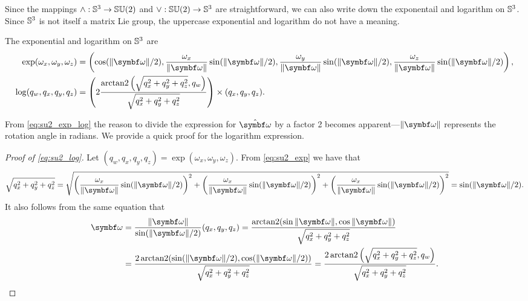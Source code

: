 Since the mappings $\wedge: {\mathbb{S}^3} \rightarrow {\mathbb{SU}(2)}$ and $\vee: {\mathbb{SU}(2)} \rightarrow {\mathbb{S}^3}$ are straightforward, we can also write down the exponentail and logarithm on ${\mathbb{S}^3}$. Since ${\mathbb{S}^3}$ is not itself a matrix Lie group, the uppercase exponential and logarithm do not have a meaning.
\begin{important}
  The exponential and logarithm on ${\mathbb{S}^3}$ are
  \begin{subequations}
    \label{eq:su2_exp_log}
    \begin{align}
      \label{eq:su2_exp}\exp (\omega_x, \omega_y, \omega_z) & = \left(
      \cos (\| \bomega \|/2), \frac{\omega_x}{\| \bomega \|} \sin (\| \bomega \|/2), \frac{\omega_y}{\| \bomega \|} \sin (\| \bomega \|/2), \frac{\omega_z}{\| \bomega \|} \sin ( \| \bomega \|/2 ) \right), \\
      \label{eq:su2_log} \log (q_w, q_x, q_y, q_z)          & = \left( 2 \frac{ \arctantwo \left(\sqrt{q_x^2 + q_y^2 + q_z^2}, q_w \right) }{ \sqrt{q_x^2 + q_y^2 + q_z^2} } \right) \times (q_x, q_y, q_z).
    \end{align}
  \end{subequations}
\end{important}
From \eqref{eq:su2_exp_log} the reason to divide the expression for $\hat \bomega$ by a factor 2  becomes apparent---$\| \bomega \|$ represents the rotation angle in radians. We provide a quick proof for the logarithm expression.
\begin{proof}[Proof of \eqref{eq:su2_log}]
  Let $(q_w, q_x, q_y, q_z) = \exp(\omega_x, \omega_y, \omega_z)$. From \eqref{eq:su2_exp} we have that
  \begin{equation}
    \sqrt{q_x^2 + q_y^2 + q_z^2} = \sqrt{ \left( \frac{\omega_x}{\| \bomega \| } \sin ( \| \bomega \| / 2) \right)^2 + \left( \frac{\omega_x}{\| \bomega \| } \sin ( \| \bomega \| / 2) \right)^2 + \left( \frac{\omega_x}{\| \bomega \| } \sin ( \| \bomega \| / 2) \right)^2 } = \sin (\| \bomega \| / 2).
  \end{equation}
  It also follows from the same equation that
  \begin{equation}
    \begin{aligned}
      \bomega & = \frac{\|\bomega\|}{\sin(\| \bomega \| / 2)}(q_x, q_y, q_z)
      = \frac{\arctantwo(\sin \| \bomega \| , \cos \| \bomega \| )}{\sqrt{q_x^2 + q_y^2 + q_z^2}}                       \\
              & = \frac{2 \arctantwo(\sin (\| \bomega \| / 2), \cos (\| \bomega \| / 2))}{\sqrt{q_x^2 + q_y^2 + q_z^2}}
      = \frac{2 \arctantwo\left( \sqrt{q_x^2 + q_y^2 + q_z^2}, q_w \right)}{\sqrt{q_x^2 + q_y^2 + q_z^2}}.
    \end{aligned}
  \end{equation}
\end{proof}

